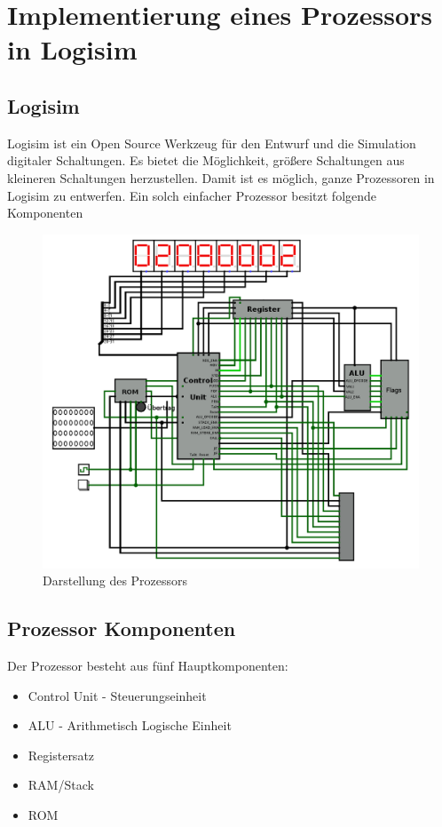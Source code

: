 \documentclass[12pt]{article}
\begin{document}
\newpage
\section{Implementierung eines Prozessors in Logisim}
\subsection{Logisim}
Logisim ist ein Open Source Werkzeug für den Entwurf und die Simulation digitaler Schaltungen. Es bietet die Möglichkeit, größere Schaltungen aus kleineren Schaltungen herzustellen. Damit ist es möglich, ganze Prozessoren in Logisim zu entwerfen. Ein solch einfacher Prozessor besitzt folgende Komponenten 

\begin{figure}[!htb]
\centering
\includegraphics[scale=0.30]{cpu}
\caption{Darstellung des Prozessors}
\centering
\label{fig:register}
\end{figure}
\newpage



\subsection{Prozessor Komponenten}
Der Prozessor besteht aus fünf Hauptkomponenten:
\begin{itemize}
\item Control Unit - Steuerungseinheit
\item ALU - Arithmetisch Logische Einheit
\item Registersatz 
\item RAM/Stack
\item ROM
\end{itemize}
\end{document}
